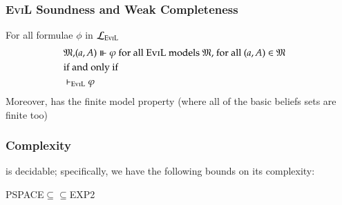 \begin{frame}
\frametitle{\textsc{EviL} Soundness and Weak Completeness}

For all formulae $\phi$ in $\mathcal{L}_{\text{{\scshape{EviL}}}}$
\begin{eqnarray*}
  & \mathfrak{M,} (a, A) \Vvdash \varphi \text{ for all {\scshape{EviL}} models
  $\mathfrak{M}$, for all $(a, A) \in \mathfrak{M}$} & \\
  & \text{if and only if} & \\
  & \vdash_{\text{{\scshape{EviL}}}} \varphi & 
\end{eqnarray*}
Moreover,  has the finite model property (where all of the
basic beliefs sets are finite too)
\end{frame}


\begin{frame}
\frametitle{Complexity}

 is decidable; specifically, we have the following bounds on
its complexity:

\begin{center}
  PSPACE$\subseteq$$\subseteq$EXP2
\end{center}
\end{frame}


